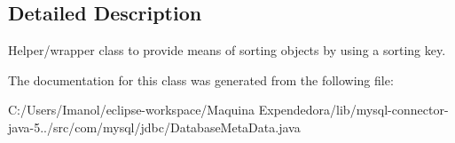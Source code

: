 \subsection{Detailed Description}
Helper/wrapper class to provide means of sorting objects by using a sorting key. 

The documentation for this class was generated from the following file\+:\begin{DoxyCompactItemize}
\item 
C\+:/\+Users/\+Imanol/eclipse-\/workspace/\+Maquina Expendedora/lib/mysql-\/connector-\/java-\/5../src/com/mysql/jdbc/Database\+Meta\+Data.\+java\end{DoxyCompactItemize}
